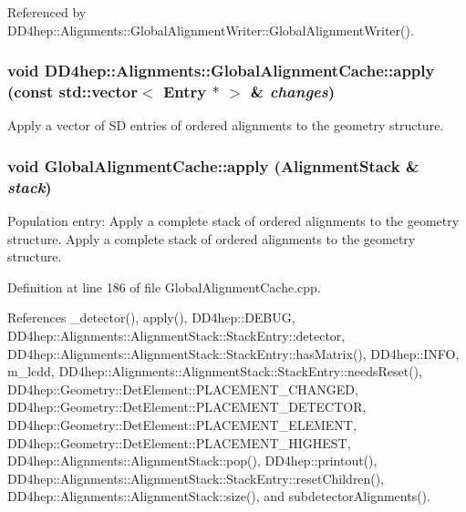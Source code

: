 Referenced by DD4hep::Alignments::GlobalAlignmentWriter::GlobalAlignmentWriter().\hypertarget{class_d_d4hep_1_1_alignments_1_1_global_alignment_cache_ac8287bc1293ffc982e0c1c0a76761945}{
\subsubsection[{apply}]{\setlength{\rightskip}{0pt plus 5cm}void DD4hep::Alignments::GlobalAlignmentCache::apply (const std::vector$<$ {\bf Entry} $\ast$ $>$ \& {\em changes})}}
\label{class_d_d4hep_1_1_alignments_1_1_global_alignment_cache_ac8287bc1293ffc982e0c1c0a76761945}


Apply a vector of SD entries of ordered alignments to the geometry structure. \hypertarget{class_d_d4hep_1_1_alignments_1_1_global_alignment_cache_a9f2812b2517bb488f3d99068fc6f4318}{
\subsubsection[{apply}]{\setlength{\rightskip}{0pt plus 5cm}void GlobalAlignmentCache::apply ({\bf AlignmentStack} \& {\em stack})}}
\label{class_d_d4hep_1_1_alignments_1_1_global_alignment_cache_a9f2812b2517bb488f3d99068fc6f4318}


Population entry: Apply a complete stack of ordered alignments to the geometry structure. Apply a complete stack of ordered alignments to the geometry structure. 

Definition at line 186 of file GlobalAlignmentCache.cpp.

References \_\-detector(), apply(), DD4hep::DEBUG, DD4hep::Alignments::AlignmentStack::StackEntry::detector, DD4hep::Alignments::AlignmentStack::StackEntry::hasMatrix(), DD4hep::INFO, m\_\-lcdd, DD4hep::Alignments::AlignmentStack::StackEntry::needsReset(), DD4hep::Geometry::DetElement::PLACEMENT\_\-CHANGED, DD4hep::Geometry::DetElement::PLACEMENT\_\-DETECTOR, DD4hep::Geometry::DetElement::PLACEMENT\_\-ELEMENT, DD4hep::Geometry::DetElement::PLACEMENT\_\-HIGHEST, DD4hep::Alignments::AlignmentStack::pop(), DD4hep::printout(), DD4hep::Alignments::AlignmentStack::StackEntry::resetChildren(), DD4hep::Alignments::AlignmentStack::size(), and subdetectorAlignments().

